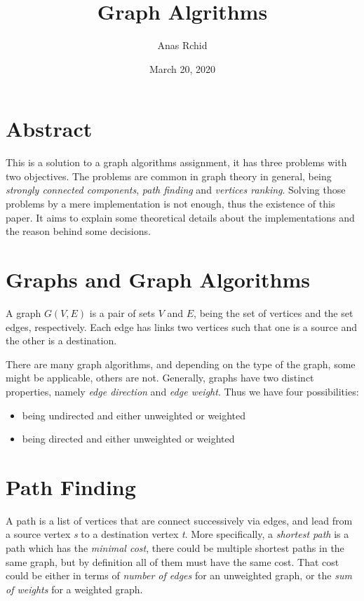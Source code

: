 \documentclass[12pt]{article}
\title{Graph Algrithms}
\author{Anas Rchid}
\date{March 20, 2020}
\begin{document}
\maketitle

\section*{Abstract}

This is a solution to a graph algorithms assignment, it has three problems with two objectives. The problems are common in graph theory in general, being \textit{strongly connected components}, \textit{path finding} and \textit{vertices ranking}. Solving those problems by a mere implementation is not enough, thus the existence of this paper. It aims to explain some theoretical details about the implementations and the reason behind some decisions.

\section{Graphs and Graph Algorithms}

A graph $G(V,E)$ is a pair of sets $V$ and $E$, being the set of vertices and the set edges, respectively. Each edge has links two vertices such that one is a source and the other is a destination.

There are many graph algorithms, and depending on the type of the graph, some might be applicable, others are not.  Generally, graphs have two distinct properties, namely \textit{edge direction} and \textit{edge weight}. Thus we have four possibilities:

\begin{itemize}
\item being undirected and either unweighted or weighted
\item being directed and either unweighted or weighted
\end{itemize}

\section{Path Finding}

A path is a list of vertices that are connect successively via edges, and lead from a source vertex \textit{s} to a destination vertex \textit{t}. More specifically, a \textit{shortest path} is a path which has the \textit{minimal cost}, there could be multiple shortest paths in the same graph, but by definition all of them must have the same cost. That cost could be either in terms of \textit{number of edges} for an unweighted graph, or the \textit{sum of weights} for a weighted graph.
\end{document}
